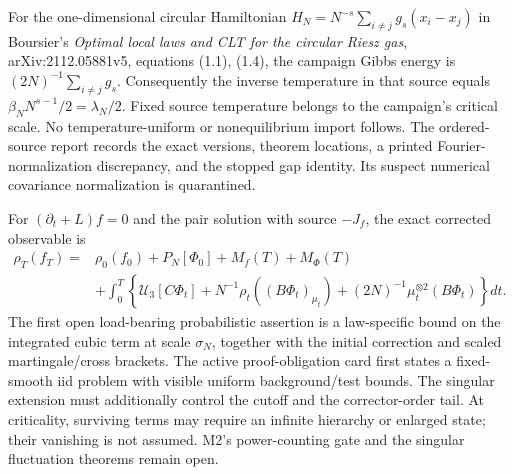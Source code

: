 \documentclass[11pt]{article}
\newcommand{\U}{\mathcal U}
\begin{document}
For the one-dimensional circular Hamiltonian
$H_N=N^{-s}\sum_{i\ne j}g_s(x_i-x_j)$ in
Boursier's \emph{Optimal local laws and CLT for the circular Riesz gas},
arXiv:2112.05881v5, equations (1.1), (1.4), the campaign Gibbs energy
is $(2N)^{-1}\sum_{i\ne j}g_s$. Consequently the inverse temperature
in that source equals $\beta_NN^{s-1}/2=\lambda_N/2$.
Fixed source temperature belongs to the campaign's critical scale.
No temperature-uniform or nonequilibrium import follows.
The ordered-source report records the exact versions, theorem locations,
a printed Fourier-normalization discrepancy, and the stopped gap identity.
Its suspect numerical covariance normalization is quarantined.

For $(\partial_t+L)f=0$ and the pair solution with source $-J_f$,
the exact corrected observable is
\begin{align*}
 \rho_T(f_T)={}&\rho_0(f_0)+P_N[\Phi_0]+M_f(T)+M_\Phi(T)\\
 &+\int_0^T\left\{\U_3[C\Phi_t]
       +N^{-1}\rho_t((B\Phi_t)_{\mu_t})
       +(2N)^{-1}\mu_t^{\otimes2}(B\Phi_t)\right\}dt.
\end{align*}
The first open load-bearing probabilistic assertion is a law-specific
bound on the integrated cubic term at scale $\sigma_N$, together with
the initial correction and scaled martingale/cross brackets. The active
proof-obligation card first states a fixed-smooth iid problem with visible
uniform background/test bounds. The singular extension must additionally
control the cutoff and the corrector-order tail. At criticality, surviving
terms may require an infinite hierarchy or enlarged state; their vanishing
is not assumed. M2's power-counting gate and the singular fluctuation
theorems remain open.
\end{document}
